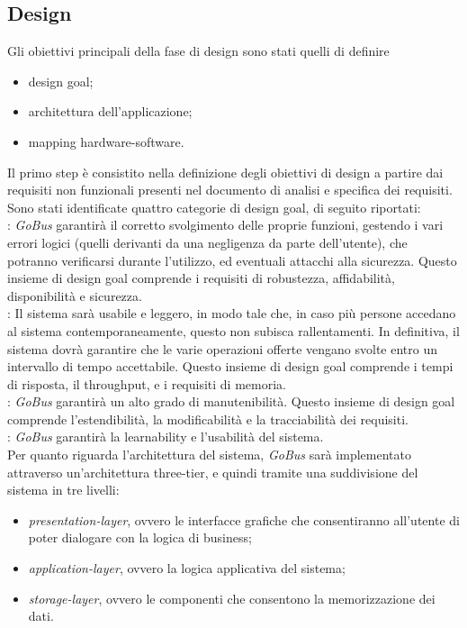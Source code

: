 \subsection{Design}
Gli obiettivi principali della fase di design sono stati quelli di definire
\begin{itemize}
\item design goal;
\item architettura dell\rq applicazione;
\item mapping hardware-software.
\end{itemize}
Il primo step \`{e} consistito nella definizione degli obiettivi di design a partire dai requisiti non funzionali presenti nel documento di analisi e specifica dei requisiti. Sono stati identificate quattro categorie di design goal, di seguito riportati:\\

:  \emph{GoBus} garantir\`{a} il corretto svolgimento delle proprie funzioni, gestendo i vari errori logici (quelli derivanti da una negligenza da parte dell\rq utente), che potranno verificarsi durante l\rq utilizzo, ed eventuali attacchi alla sicurezza. Questo insieme di design goal comprende i requisiti di robustezza, affidabilit\`{a}, disponibilit\`{a} e sicurezza.\\

:  Il sistema sar\`{a} usabile e leggero, in modo tale che, in caso più persone accedano al sistema contemporaneamente, questo non subisca rallentamenti. In definitiva, il sistema dovr\`{a} garantire che le varie operazioni offerte vengano svolte entro un intervallo di tempo accettabile. Questo insieme di design goal comprende i tempi di risposta, il throughput, e i requisiti di memoria.\\

:  \emph{GoBus} garantir\`{a} un alto grado di manutenibilit\`{a}. Questo insieme di design goal comprende l\rq estendibilit\`{a}, la modificabilit\`{a} e la tracciabilit\`{a} dei requisiti.\\

:  \emph{GoBus} garantir\`{a} la learnability e l\rq usabilit\`{a} del sistema.\\

Per quanto riguarda l\rq architettura del sistema, \emph{GoBus} sar\`{a} implementato attraverso un'architettura three-tier, e quindi tramite una suddivisione del sistema in tre livelli:
\begin{itemize}
\item \emph{presentation-layer}, ovvero le interfacce grafiche che consentiranno all\rq utente di poter dialogare con la logica di business;
\item \emph{application-layer}, ovvero la logica applicativa del sistema;
\item \emph{storage-layer}, ovvero le componenti che consentono la memorizzazione dei dati.
\end{itemize}


